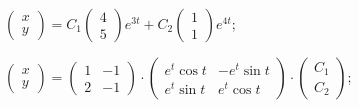 \begin{enumsolsfull}
		\item \( \begin{pmatrix} x \\ y \end{pmatrix} = C_1 \begin{pmatrix} 4 \\ 5 \end{pmatrix} e^{3t} + C_2 \begin{pmatrix} 1 \\ 1 \end{pmatrix} e^{4t} \); %
		\item \( \begin{pmatrix} x \\ y \end{pmatrix} = \begin{pmatrix} 1 & -1 \\ 2 & -1 \end{pmatrix} \cdot \begin{pmatrix} e^{t} \cos{t} & -e^{t} \sin{t} \\ e^{t} \sin{t} & e^{t} \cos{t} \end{pmatrix} \cdot \begin{pmatrix} C_1 \\ C_2 \end{pmatrix} \); %

\end{enumsolsfull}
